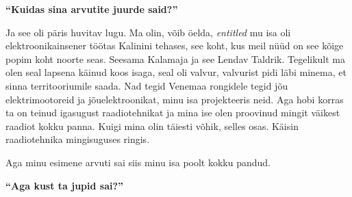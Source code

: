 
\textbf{\enquote{Kuidas sina arvutite juurde said?}}

Ja see oli päris huvitav lugu. Ma olin, võib öelda, \emph{entitled} mu isa oli
elektroonikainsener töötas Kalinini tehases, see koht, kus meil nüüd on
see kõige popim koht noorte seas. Seesama Kalamaja ja see Lendav Taldrik.
Tegelikult ma olen seal lapsena käinud koos isaga, seal oli valvur, valvurist
pidi läbi minema, et sinna territooriumile saada. Nad tegid Venemaa rongidele
tegid jõu elektrimootoreid ja jõuelektroonikat, minu isa projekteeris neid. Aga
hobi korras ta on teinud igasugust raadiotehnikat ja mina ise olen proovinud
mingit väikest raadiot kokku panna. Kuigi mina olin täiesti võhik, selles osas.
Käisin raadiotehnika mingisuguses ringis.

Aga minu esimene arvuti sai siis minu isa poolt kokku pandud.

\textbf{\enquote{Aga kust ta jupid sai?}}

